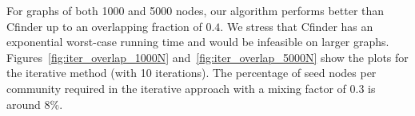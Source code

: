 For graphs of both 1000 and 5000 nodes, our algorithm performs better 
than Cfinder up to an overlapping fraction of $0.4$. We stress that Cfinder 
has an exponential worst-case running time and would be infeasible on larger graphs. 
%
Figures~\ref{fig:iter_overlap_1000N} and~\ref{fig:iter_overlap_5000N} show the 
plots for the iterative method (with 10 iterations). 
The percentage of seed nodes per community required in the 
iterative approach with a mixing factor of $0.3$ is around 8$\%$. 



